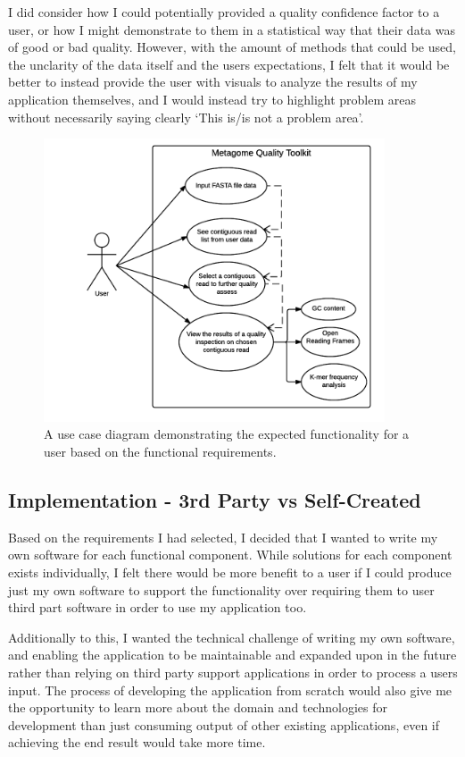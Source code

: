 I did consider how I could potentially provided a quality confidence factor to a user, or how I might demonstrate to them in a statistical way that their data was of good or bad quality. However, with the amount of methods that could be used, the unclarity of the data itself and the users expectations, I felt that it would be better to instead provide the user with visuals to analyze the results of my application themselves, and I would instead try to highlight problem areas without necessarily saying clearly `This is/is not a problem area'.

\begin{figure}[H]
 \centering
\includegraphics[width=0.9\textwidth]{images/usecase}
\caption{A use case diagram demonstrating the expected functionality for a user based on the functional requirements.}
\end{figure}

\subsection{Implementation - 3rd Party vs Self-Created}
Based on the requirements I had selected, I decided that I wanted to write my own software for each functional component. While solutions for each component exists individually, I felt there would be more benefit to a user if I could produce just my own software to support the functionality over requiring them to user third part software in order to use my application too.

Additionally to this, I wanted the technical challenge of writing my own software, and enabling the application to be maintainable and expanded upon in the future rather than relying on third party support applications in order to process a users input. The process of developing the application from scratch would also give me the opportunity to learn more about the domain and technologies for development than just consuming output of other existing applications, even if achieving the end result would take more time.

